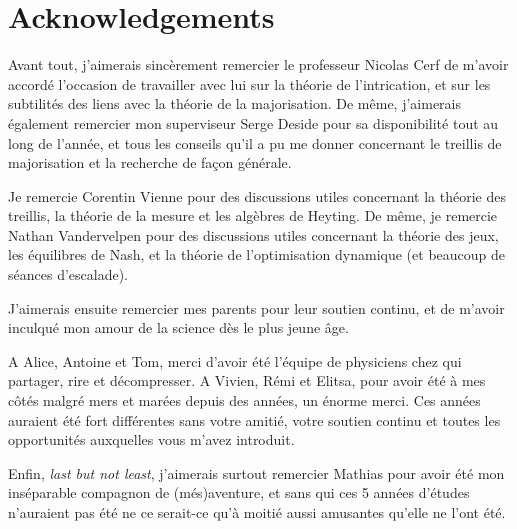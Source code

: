 \section*{Acknowledgements}

Avant tout, j'aimerais sincèrement remercier le professeur Nicolas Cerf de m'avoir accordé l'occasion de travailler avec lui sur la théorie de l'intrication, et sur les subtilités des liens avec la théorie de la majorisation. De même, j'aimerais également remercier mon superviseur Serge Deside pour sa disponibilité tout au long de l'année, et tous les conseils qu'il a pu me donner concernant le treillis de majorisation et la recherche de façon générale.

Je remercie Corentin Vienne pour des discussions utiles concernant la théorie des treillis, la théorie de la mesure et les algèbres de Heyting. De même, je remercie Nathan Vandervelpen pour des discussions utiles concernant la théorie des jeux, les équilibres de Nash, et la théorie de l'optimisation dynamique (et beaucoup de séances d'escalade).

J'aimerais ensuite remercier mes parents pour leur soutien continu, et de m'avoir inculqué mon amour de la science dès le plus jeune âge.

A Alice, Antoine et Tom, merci d'avoir été l'équipe de physiciens chez qui partager, rire et décompresser. A Vivien, Rémi et Elitsa, pour avoir été à mes côtés malgré mers et marées depuis des années, un énorme merci. Ces années auraient été fort différentes sans votre amitié, votre soutien continu et toutes les opportunités auxquelles vous m'avez introduit.

Enfin, \textit{last but not least}, j'aimerais surtout remercier Mathias pour avoir été mon inséparable compagnon de (més)aventure, et sans qui ces 5 années d'études n'auraient pas été ne ce serait-ce qu'à moitié aussi amusantes qu'elle ne l'ont été.

